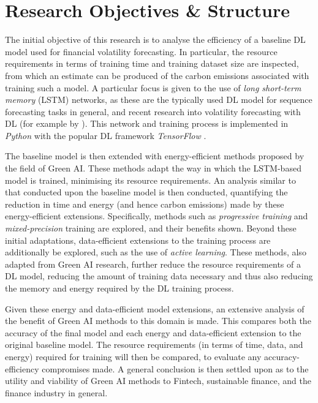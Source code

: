 \documentclass[a4paper, 11pt]{report}
\begin{document}
    \section{Research Objectives \& Structure}
    \label{section: structure}

    The initial objective of this research is to analyse the efficiency of a baseline DL model used for financial volatility forecasting. In particular, the resource requirements in terms of training time and training dataset size are inspected, from which an estimate can be produced of the carbon emissions associated with training such a model. A particular focus is given to the use of \emph{long short-term memory} (LSTM) networks, as these are the typically used DL model for sequence forecasting tasks in general, and recent research into volatility forecasting with DL (for example by \citet{xiong-2015}). This network and training process is implemented in \emph{Python} with the popular DL framework \emph{TensorFlow} \citep{abadi-2016}.

    The baseline model is then extended with energy-efficient methods proposed by the field of Green AI. These methods adapt the way in which the LSTM-based model is trained, minimising its resource requirements. An analysis similar to that conducted upon the baseline model is then conducted, quantifying the reduction in time and energy (and hence carbon emissions) made by these energy-efficient extensions. Specifically, methods such as \emph{progressive training} and \emph{mixed-precision} training are explored, and their benefits shown. Beyond these initial adaptations, data-efficient extensions to the training process are additionally be explored, such as the use of \emph{active learning}. These methods, also adapted from Green AI research, further reduce the resource requirements of a DL model, reducing the amount of training data necessary and thus also reducing the memory and energy required by the DL training process.

    Given these energy and data-efficient model extensions, an extensive analysis of the benefit of Green AI methods to this domain is made. This compares both the accuracy of the final model and each energy and data-efficient extension to the original baseline model. The resource requirements (in terms of time, data, and energy) required for training will then be compared, to evaluate any accuracy-efficiency compromises made. A general conclusion is then settled upon as to the utility and viability of Green AI methods to Fintech, sustainable finance, and the finance industry in general.
\end{document}
